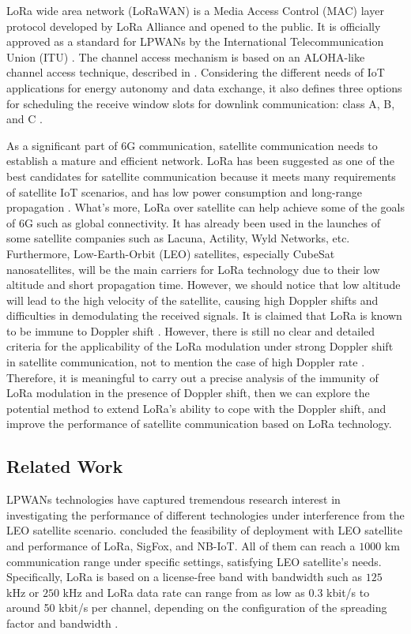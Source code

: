 \documentclass{IEEEtaes}
\theoremstyle{plain}
\begin{document}
LoRa wide area network (LoRaWAN) is a Media Access Control (MAC) layer protocol developed by LoRa Alliance and opened to the public. It is officially approved as a standard for LPWANs by the International Telecommunication Union (ITU) \cite{LoRaWAN}. The channel access mechanism is based on an ALOHA-like channel access technique, described in \cite{el2018lora}.  Considering the different needs of IoT applications for energy autonomy and data exchange, it also defines three options for scheduling the receive window slots for downlink communication: class A, B, and C \cite{petajajarvi2017performance}. 

As a significant part of 6G communication, satellite communication needs to establish a mature and efficient network. LoRa has been suggested as one of the best candidates for satellite communication because it meets many requirements of satellite IoT scenarios, and has low power consumption and long-range propagation \cite{kiki2022improved,wu2019research}. What's more, LoRa over satellite can help achieve some of the goals of 6G such as global connectivity.
It has already been used in the launches of some satellite companies such as Lacuna, Actility, Wyld Networks, etc. 
Furthermore, Low-Earth-Orbit (LEO) satellites, especially CubeSat nanosatellites, will be the main carriers for LoRa technology due to their low altitude and short propagation time. However, we should notice that low altitude will lead to the high velocity of the satellite, causing high Doppler shifts and difficulties in demodulating the received signals. It is claimed that LoRa is known to be immune to Doppler shift \cite{liando2019known}. However, there is still no clear and detailed criteria for the applicability of the LoRa modulation under strong Doppler shift in satellite communication, not to mention the case of high Doppler rate \cite{doroshkin2019experimental}.
Therefore, it is meaningful to carry out a precise analysis of the immunity of LoRa modulation in the presence of Doppler shift, then we can explore the potential method to extend LoRa's ability to cope with the Doppler shift, and improve the performance of satellite communication based on LoRa technology.

\subsection{Related Work}
LPWANs technologies have captured tremendous research interest in investigating the performance of different technologies under interference from the LEO satellite scenario. \cite{temim2022low,wang2022performance} concluded the feasibility of deployment with LEO satellite and performance of LoRa, SigFox, and NB-IoT. All of them can reach a $1000$ km communication range under specific settings, satisfying LEO satellite's needs. Specifically, LoRa is based on a license-free band with bandwidth such as $125$ kHz or $250$ kHz and LoRa data rate can range from as low as 0.3 kbit/s to around 50 kbit/s per channel, depending on the configuration of the spreading factor and bandwidth \cite{LoRaAlliance2020}.
\end{document}
